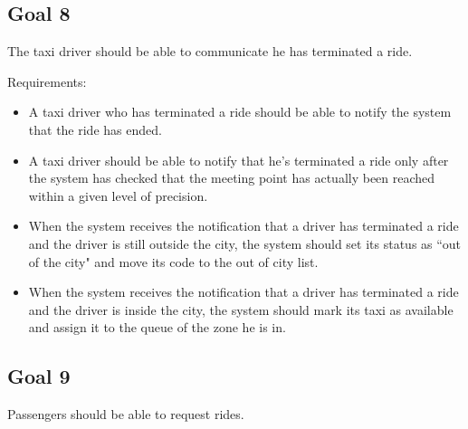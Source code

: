 \subsection{Goal 8}
The taxi driver should be able to communicate he has terminated a ride.

Requirements:
\begin{itemize}
\item A taxi driver who has terminated a ride should be able to notify the system that the ride has ended.
\item A taxi driver should be able to notify that he's terminated a ride only after the system has checked that the meeting point has actually been reached within a given level of precision.
\item When the system receives the notification that a driver has terminated a ride and the driver is still outside the city, the system should set its status as ``out of the city" and move its code to the out of city list.
\item When the system receives the notification that a driver has terminated a ride and the driver is inside the city, the system should mark its taxi as available and assign it to the queue of the zone he is in.
\end{itemize}


\subsection{Goal 9}
Passengers should be able to request rides.


